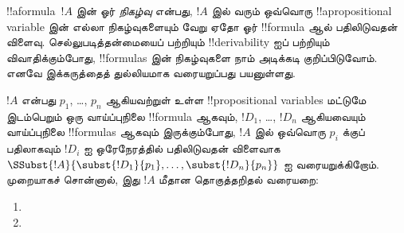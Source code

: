 \documentclass[../../../include/open-logic-section]{subfiles}
\begin{document}


!!a{formula}~$!A$ இன் ஓர் \emph{நிகழ்வு} என்பது, $!A$ இல் வரும் ஒவ்வொரு
!!a{propositional variable} இன் எல்லா நிகழ்வுகளையும் வேறு ஏதோ ஓர்
!!{formula} ஆல் பதிலிடுவதன் விளைவு. செல்லுபடித்தன்மையைப் பற்றியும்
!!{derivability} ஐப் பற்றியும் விவாதிக்கும்போது, !!{formula}s இன்
நிகழ்வுகளை நாம் அடிக்கடி குறிப்பிடுவோம். எனவே இக்கருத்தைத் துல்லியமாக
வரையறுப்பது பயனுள்ளது.

\begin{defn}
  $!A$ என்பது $p_1$, \dots, $p_n$ ஆகியவற்றுள் உள்ள !!{propositional
    variable}s மட்டுமே இடம்பெறும் ஒரு வாய்ப்புநிலை !!{formula} ஆகவும்,
  $!D_1$, \dots, $!D_n$ ஆகியவையும் வாய்ப்புநிலை !!{formula}s ஆகவும்
  இருக்கும்போது, $!A$ இல் ஒவ்வொரு $p_i$ க்குப் பதிலாகவும் $!D_i$ ஐ
  ஒரேநேரத்தில் பதிலிடுவதன் விளைவாக
  $\SSubst{!A}{\subst{!D_1}{p_1}, \dots, \subst{!D_n}{p_n}}$ ஐ
  வரையறுக்கிறோம். முறையாகச் சொன்னால், இது $!A$ மீதான தொகுத்தறிதல்
  வரையறை:
  \begin{enumerate}
    \item {}
    \item {}
\end{enumerate}
\end{defn}
\end{document}

